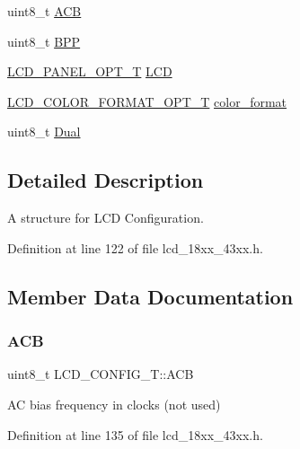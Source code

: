 \begin{DoxyCompactItemize}
\item 
uint8\+\_\+t \hyperlink{struct_l_c_d___c_o_n_f_i_g___t_a7192132049d5782a2c53ad35e6773892}{A\+CB}
\item 
uint8\+\_\+t \hyperlink{struct_l_c_d___c_o_n_f_i_g___t_a6a62794b32307bbbc4b9cd84f05faa85}{B\+PP}
\item 
\hyperlink{group___l_c_d__18_x_x__43_x_x_gaceee4b8b7afdc1a97b365dc2feb4ecca}{L\+C\+D\+\_\+\+P\+A\+N\+E\+L\+\_\+\+O\+P\+T\+\_\+T} \hyperlink{struct_l_c_d___c_o_n_f_i_g___t_a1eda2297e9d1a5a027c7e0aa68da0b47}{L\+CD}
\item 
\hyperlink{group___l_c_d__18_x_x__43_x_x_gac365c31cd880844cf31747394cd0f93a}{L\+C\+D\+\_\+\+C\+O\+L\+O\+R\+\_\+\+F\+O\+R\+M\+A\+T\+\_\+\+O\+P\+T\+\_\+T} \hyperlink{struct_l_c_d___c_o_n_f_i_g___t_acd4fe9229c706bbe095f836ca512f23a}{color\+\_\+format}
\item 
uint8\+\_\+t \hyperlink{struct_l_c_d___c_o_n_f_i_g___t_a9cd1e64941fe8ba8324f92677f2b20e7}{Dual}
\end{DoxyCompactItemize}


\subsection{Detailed Description}
A structure for L\+CD Configuration. 

Definition at line 122 of file lcd\+\_\+18xx\+\_\+43xx.\+h.



\subsection{Member Data Documentation}
\mbox{\label{struct_l_c_d___c_o_n_f_i_g___t_a7192132049d5782a2c53ad35e6773892}} 
\subsubsection{\texorpdfstring{A\+CB}{ACB}}
{\footnotesize\ttfamily uint8\+\_\+t L\+C\+D\+\_\+\+C\+O\+N\+F\+I\+G\+\_\+\+T\+::\+A\+CB}

AC bias frequency in clocks (not used) 

Definition at line 135 of file lcd\+\_\+18xx\+\_\+43xx.\+h.

\mbox{\label{struct_l_c_d___c_o_n_f_i_g___t_a6a62794b32307bbbc4b9cd84f05faa85}} 
